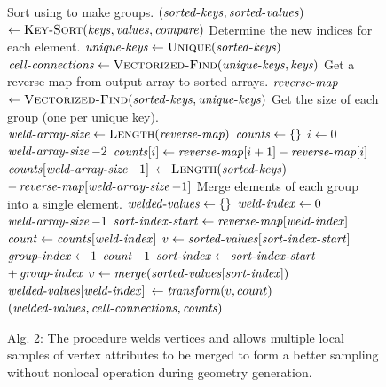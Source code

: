 \documentclass[10pt,journal,cspaper,compsoc]{IEEEtran}
\begin{document}
\noindent
\begin{figure}
\vspace{-.32cm}
\begin{codebox}
  \zi \Comment Sort  using  to make groups.
  \li $(\id{sorted-keys},\id{sorted-values})$
  \zi \>\> $\gets \proc{Key-Sort}(\id{keys},\id{values},\id{compare})$
  \zi \Comment Determine the new indices for each element.
  \li $\id{unique-keys} \gets \proc{Unique}(\id{sorted-keys})$
  \li $\id{cell-connections} \gets \proc{Vectorized-Find}(\id{unique-keys},\id{keys})$
  \zi \Comment Get a reverse map from output array to sorted arrays.
  \li $\id{reverse-map}$
  \zi \>\> $\gets \proc{Vectorized-Find}(\id{sorted-keys},\id{unique-keys})$
  \zi \Comment Get the size of each group (one per unique key).
  \li $\id{weld-array-size} \gets \proc{Length}(\id{reverse-map})$
  \li $\id{counts} \gets \{ \}$
  \li \For $i \gets 0$ \To $\id{weld-array-size} - 2$
  \zi \Do {}
  \li     $\id{counts}[i] \gets \id{reverse-map}[i+1] - \id{reverse-map}[i]$
      \End
  \li $\id{counts}[\id{weld-array-size}-1]$
  \zi \>\> $\gets \proc{Length}(\id{sorted-keys})$
  \zi \>\>\> $ - \id{reverse-map}[\id{weld-array-size}-1]$
  \zi \Comment Merge elements of each group into a single element.
  \li $\id{welded-values} \gets \{ \}$
  \li \For $\id{weld-index} \gets 0$ \To $\id{weld-array-size} - 1$
  \zi \Do {}
  \li     $\id{sort-index-start} \gets \id{reverse-map}[\id{weld-index}]$
  \li     $\id{count} \gets \id{counts}[\id{weld-index}]$
  \li     $v \gets \id{sorted-values}[\id{sort-index-start}]$
  \li     \For $\id{group-index} \gets 1$ \To $\id{count} - 1$
  \zi     \Do
  \li         $\id{sort-index} \gets \id{sort-index-start}$
  \zi         \>\>\>\> $+ \id{group-index}$
  \li         $v \gets \id{merge}(\id{sorted-values}[\id{sort-index}])$
          \End
  \li     $\id{welded-values}[\id{weld-index}]$
  \zi     \>\> $\gets \id{transform}(v, count)$
      \End
  \li \Return $(\id{welded-values}, \id{cell-connections}, \id{counts})$
\end{codebox}
\vspace{-0.47cm}
\caption*{Alg. 2: The  procedure welds vertices and allows multiple local samples of vertex attributes to be merged to form a better sampling without nonlocal operation during geometry generation.}
\end{figure}
\end{document}
